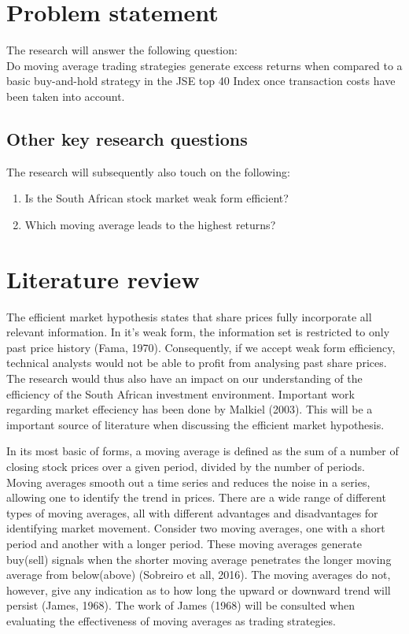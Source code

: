 \documentclass[12pt]{article}
\begin{document}
\section{Problem statement}
\label{sec:prob state}
The research will answer the following question: 
\\Do moving average trading strategies generate excess returns when compared to a basic buy-and-hold strategy in the JSE top 40 Index once transaction costs have been taken into account.

\subsection{Other key research questions}
\label{sub:other key quest} 
The research will subsequently also touch on the following:
\begin{enumerate}
\item Is the South African stock market weak form efficient?
\item Which moving average leads to the highest returns?

\end{enumerate}

\section{Literature review}
\label{sec:lit rev}

The efficient market hypothesis states that share prices fully incorporate all relevant information. In it's weak form, the information set is restricted to only past price history (Fama, 1970). Consequently, if we accept weak form efficiency, technical analysts would not be able to profit from analysing past share prices. The research would thus also have an impact on our understanding of the efficiency of the South African investment environment. Important work regarding market effeciency has been done by Malkiel (2003). This will be a important source of literature when discussing the efficient market hypothesis. 

In its most basic of forms, a moving average is defined as the sum of a number of closing stock prices over a given period, divided by the number of periods. Moving averages smooth out a time series and reduces the noise in a series, allowing one to identify the trend in prices. There are a wide range of different types of moving averages, all with different advantages and disadvantages for identifying market movement. Consider two moving averages, one with a short period and another with a longer period. These moving averages generate buy(sell) signals when the shorter moving average penetrates the longer moving average from below(above) (Sobreiro et all, 2016). The moving averages do not, however, give any indication as to how long the upward or downward trend will persist (James, 1968). The work of James (1968) will be consulted when evaluating the effectiveness of moving averages as trading strategies. 
\end{document}
